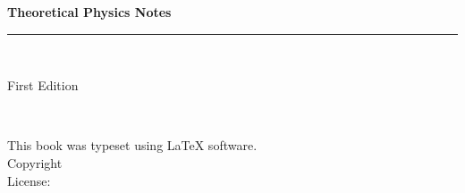 \begin{titlepage}
\begin{flushleft}

\textbf{\fontsize{48}{54}\selectfont Theoretical Physics Notes\\}

\par\noindent\rule{\textwidth}{4pt}\\


\begin{flushright}
\Large First Edition
\end{flushright}

\vspace{\fill}

\textbf{\large \bookauthor}\\[3.5pt]
\textbf{\large \textit{\authorsubtitle}}

\vspace{\fill}

\end{flushleft}
\end{titlepage}
\restoregeometry

\thispagestyle{empty}

\begin{flushleft}
\vspace*{\fill}
This book was typeset using \LaTeX{} software.\\
\vspace{\fill}
Copyright \textcopyright{} \the\year{}  \bookauthor\\
License: \booklicense
\end{flushleft}

\addtocounter{page}{2}
